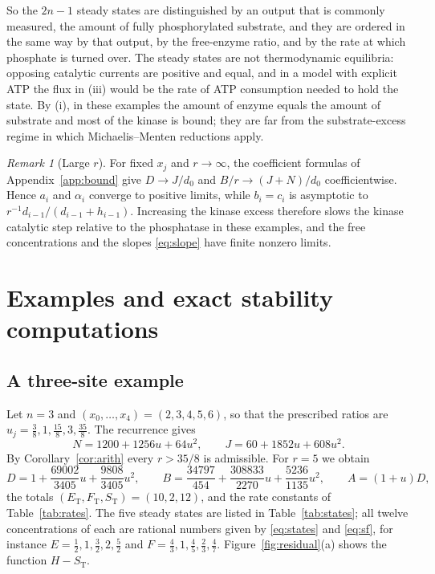 \documentclass[11pt]{article}
\theoremstyle{plain}
\theoremstyle{definition}
\theoremstyle{remark}
\newtheorem{remark}[theorem]{Remark}
\numberwithin{equation}{section}
\newcommand{\ET}{E_{\mathrm T}}
\newcommand{\FT}{F_{\mathrm T}}
\newcommand{\ST}{S_{\mathrm T}}
\begin{document}
So the \(2n-1\) steady states are distinguished by an output that is commonly measured, the
amount of fully phosphorylated substrate, and they are ordered in the same way by that
output, by the free-enzyme ratio, and by the rate at which phosphate is turned over. The
steady states are not thermodynamic equilibria: opposing catalytic currents are positive and
equal, and in a model with explicit ATP the flux in (iii) would be the rate of ATP
consumption needed to hold the state. By (i), in these examples the amount of enzyme equals
the amount of substrate and most of the kinase is bound; they are far from the
substrate-excess regime in which Michaelis--Menten reductions apply.

\begin{remark}[Large \(r\)]\label{rem:larger}
For fixed \(x_j\) and \(r\to\infty\), the coefficient formulas of Appendix~\ref{app:bound}
give \(D\to J/d_0\) and \(B/r\to(J+N)/d_0\) coefficientwise. Hence \(a_i\) and \(\alpha_i\)
converge to positive limits, while \(b_i=c_i\) is asymptotic to
\(r^{-1}d_{i-1}/(d_{i-1}+h_{i-1})\). Increasing the kinase excess therefore slows the kinase
catalytic step relative to the phosphatase in these examples, and the free concentrations and
the slopes \eqref{eq:slope} have finite nonzero limits.
\end{remark}

\section{Examples and exact stability computations}\label{sec:examples}

\subsection{A three-site example}
Let \(n=3\) and \((x_0,\dots,x_4)=(2,3,4,5,6)\), so that the prescribed ratios are
\(u_j=\tfrac38,1,\tfrac{15}8,3,\tfrac{35}8\). The recurrence gives
\[
 N=1200+1256u+64u^2,\qquad J=60+1852u+608u^2 .
\]
By Corollary~\ref{cor:arith} every \(r>35/8\) is admissible. For \(r=5\) we obtain
\begin{equation}\label{eq:example}
 D=1+\frac{69002}{3405}u+\frac{9808}{3405}u^2,\qquad
 B=\frac{34797}{454}+\frac{308833}{2270}u+\frac{5236}{1135}u^2,\qquad A=(1+u)D,
\end{equation}
the totals \((\ET,\FT,\ST)=(10,2,12)\), and the rate constants of Table~\ref{tab:rates}. The
five steady states are listed in Table~\ref{tab:states}; all twelve concentrations of each are
rational numbers given by \eqref{eq:states} and \eqref{eq:sf}, for instance
\(E=\tfrac12,1,\tfrac32,2,\tfrac52\) and \(F=\tfrac43,1,\tfrac45,\tfrac23,\tfrac47\).
Figure~\ref{fig:residual}(a) shows the function \(H-\ST\).
\end{document}
